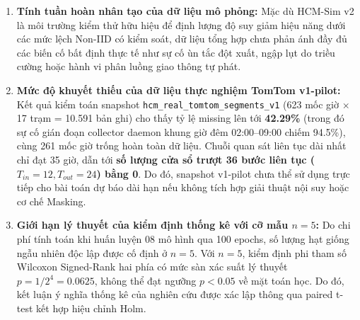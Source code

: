\begin{enumerate}
    \item \textbf{Tính tuần hoàn nhân tạo của dữ liệu mô phỏng:} Mặc dù HCM-Sim v2 là môi trường kiểm thử hữu hiệu để định lượng độ suy giảm hiệu năng dưới các mức lệch Non-IID có kiểm soát, dữ liệu tổng hợp chưa phản ánh đầy đủ các biến cố bất định thực tế như sự cố ùn tắc đột xuất, ngập lụt do triều cường hoặc hành vi phân luồng giao thông tự phát.
    \item \textbf{Mức độ khuyết thiếu của dữ liệu thực nghiệm TomTom v1-pilot:} Kết quả kiểm toán snapshot \texttt{hcm\_real\_tomtom\_segments\_v1} (623 mốc giờ $\times$ 17 trạm = 10.591 bản ghi) cho thấy tỷ lệ missing lên tới \textbf{42.29\%} (trong đó sự cố gián đoạn collector daemon khung giờ đêm 02:00--09:00 chiếm 94.5\%), cùng 261 mốc giờ trống hoàn toàn dữ liệu. Chuỗi quan sát liên tục dài nhất chỉ đạt 35 giờ, dẫn tới \textbf{số lượng cửa sổ trượt 36 bước liên tục ($T_{in}=12, T_{out}=24$) bằng 0}. Do đó, snapshot v1-pilot chưa thể sử dụng trực tiếp cho bài toán dự báo dài hạn nếu không tích hợp giải thuật nội suy hoặc cơ chế Masking.
    \item \textbf{Giới hạn lý thuyết của kiểm định thống kê với cỡ mẫu $n=5$:} Do chi phí tính toán khi huấn luyện 08 mô hình qua 100 epochs, số lượng hạt giống ngẫu nhiên độc lập được cố định ở $n = 5$. Với $n = 5$, kiểm định phi tham số Wilcoxon Signed-Rank hai phía có mức sàn xác suất lý thuyết $p = 1/2^4 = 0.0625$, không thể đạt ngưỡng $p < 0.05$ về mặt toán học. Do đó, kết luận ý nghĩa thống kê của nghiên cứu được xác lập thông qua paired t-test kết hợp hiệu chỉnh Holm.
\end{enumerate}
